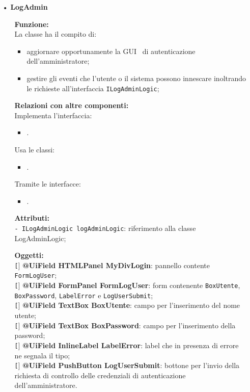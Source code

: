 {\begin{sloppypar}
{\begin{itemize}
		\item[•] \textbf{LogAdmin}
			\begin{itemize}
				\item[]  \textbf{Funzione:} \\
				La classe ha il compito di:
				\begin{itemize}
					\item aggiornare opportunamente la GUI\g~ di autenticazione dell’amministratore;
					\item gestire gli eventi che l’utente o il sistema possono innescare inoltrando le richieste all'interfaccia \texttt{ILogAdminLogic};
				\end{itemize}
				
				\item[]  \textbf{Relazioni con altre componenti:} \\
				Implementa l'interfaccia:
				\begin{itemize}
					\item {}.
				\end{itemize}
				Usa le classi:
				\begin{itemize}
					\item {}.
				\end{itemize}
				Tramite le interfacce:
				\begin{itemize}
					\item {}.
				\end{itemize}

				\item[] \textbf{Attributi:}\\
					\texttt{- ILogAdminLogic logAdminLogic}: riferimento alla classe LogAdminLogic;\\
				
				\item[] \textbf{Oggetti:}\\
					\texttt[] \textbf{@UiField HTMLPanel MyDivLogin}: pannello contente \texttt{FormLogUser};\\
					\texttt[] \textbf{@UiField FormPanel FormLogUser}: form contenente \texttt{BoxUtente}, \texttt{BoxPassword}, \texttt{LabelError} e \texttt{LogUserSubmit};\\
					\texttt[] \textbf{@UiField TextBox BoxUtente}: campo per l'inserimento del nome utente;\\
					\texttt[] \textbf{@UiField TextBox BoxPassword}: campo per l'inserimento della password;\\
					\texttt[] \textbf{@UiField InlineLabel LabelError}: label che in presenza di errore ne segnala il tipo;\\
					\texttt[] \textbf{@UiField PushButton LogUserSubmit}: bottone per l'invio della richiesta di controllo delle credenziali di autenticazione dell’amministratore.\\
				

\end{itemize}
\end{itemize}}
\end{sloppypar}}
